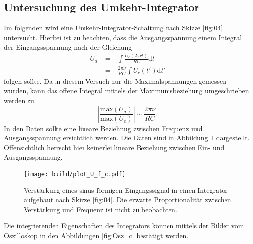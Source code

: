 \subsection{Untersuchung des Umkehr-Integrator}
Im folgenden wird eine Umkehr-Integrator-Schaltung nach Skizze \ref{fig:04} untersucht. Hierbei ist zu beachten, dass die Ausgangsspannung einem Integral der Eingangsspannung nach der Gleichung
\begin{align}
  U_a &= -\int \frac{U_e(2\pi \nu t)}{RC}\text{d}t\\
      &= -\frac{2\pi\nu}{RC} \int U_e(t') \text{d}t'
\end{align}
folgen sollte. Da in diesem Versuch nur die Maximalspannungen gemessen wurden, kann das offene Integral mittels der Maximumsbeziehung umgeschrieben werden zu
\begin{equation}
  \left|\frac{\text{max}\left(U_a\right)}{\text{max}\left(U_e\right)}\right| \sim \frac{2\pi\nu}{RC}.
\end{equation}
In den Daten sollte eine lineare Beziehnug zwischen Frequenz und Ausgangsspannung ersichtlich werden. Die Daten sind in Abbildung \ref{fig:Plot_c} dargestellt. Offensichtlich herrscht hier keinerlei lineare Beziehung zwischen Ein- und Ausgangsspannung.
\FloatBarrier
\begin{figure}
  \centering
  \texttt{[image: build/plot\_U\_f\_c.pdf]}
  \caption{Verstärkung eines sinus-förmigen Eingangssignal in einen Integrator aufgebaut nach Skizze \ref{fig:04}. Die erwarte Proportionalität zwischen Verstärkung und Frequenz ist nicht zu beobachten.}
  \label{fig:Plot_c}
\end{figure}
Die integrierenden Eigenschaften des Integrators können mittels der Bilder vom Oszilloskop in den Abbildungen \ref{fig:Osz_c} bestätigt werden.
\FloatBarrier
\FloatBarrier
